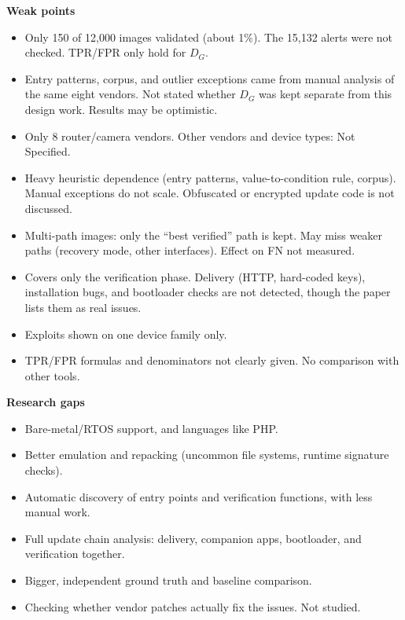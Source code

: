 \documentclass[11pt,a4paper]{article}
\begin{document}
\begin{enumerate}
    \vspace{4pt}
    \textbf{Weak points}
    \begin{itemize}
        \item Only 150 of 12,000 images validated (about 1\%). The 15,132 alerts were not checked. TPR/FPR only hold for $D_G$.
        \item Entry patterns, corpus, and outlier exceptions came from manual analysis of the same eight vendors. Not stated whether $D_G$ was kept separate from this design work. Results may be optimistic.
        \item Only 8 router/camera vendors. Other vendors and device types: Not Specified.
        \item Heavy heuristic dependence (entry patterns, value-to-condition rule, corpus). Manual exceptions do not scale. Obfuscated or encrypted update code is not discussed.
        \item Multi-path images: only the ``best verified'' path is kept. May miss weaker paths (recovery mode, other interfaces). Effect on FN not measured.
        \item Covers only the verification phase. Delivery (HTTP, hard-coded keys), installation bugs, and bootloader checks are not detected, though the paper lists them as real issues.
        \item Exploits shown on one device family only.
        \item TPR/FPR formulas and denominators not clearly given. No comparison with other tools.
    \end{itemize}

    \vspace{4pt}
    \textbf{Research gaps}
    \begin{itemize}
        \item Bare-metal/RTOS support, and languages like PHP.
        \item Better emulation and repacking (uncommon file systems, runtime signature checks).
        \item Automatic discovery of entry points and verification functions, with less manual work.
        \item Full update chain analysis: delivery, companion apps, bootloader, and verification together.
        \item Bigger, independent ground truth and baseline comparison.
        \item Checking whether vendor patches actually fix the issues. Not studied.
    \end{itemize}

\end{enumerate}
\end{document}
